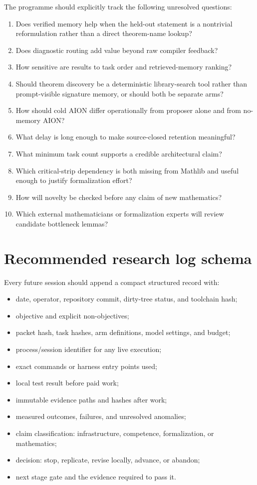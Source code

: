 \documentclass[11pt,a4paper]{article}
\begin{document}
The programme should explicitly track the following unresolved questions:

\begin{enumerate}
  \item Does verified memory help when the held-out statement is a nontrivial
  reformulation rather than a direct theorem-name lookup?
  \item Does diagnostic routing add value beyond raw compiler feedback?
  \item How sensitive are results to task order and retrieved-memory ranking?
  \item Should theorem discovery be a deterministic library-search tool rather
  than prompt-visible signature memory, or should both be separate arms?
  \item How should cold AION differ operationally from proposer alone and from
  no-memory AION?
  \item What delay is long enough to make source-closed retention meaningful?
  \item What minimum task count supports a credible architectural claim?
  \item Which critical-strip dependency is both missing from Mathlib and useful
  enough to justify formalization effort?
  \item How will novelty be checked before any claim of new mathematics?
  \item Which external mathematicians or formalization experts will review
  candidate bottleneck lemmas?
\end{enumerate}

\section{Recommended research log schema}

Every future session should append a compact structured record with:

\begin{itemize}
  \item date, operator, repository commit, dirty-tree status, and toolchain hash;
  \item objective and explicit non-objectives;
  \item packet hash, task hashes, arm definitions, model settings, and budget;
  \item process/session identifier for any live execution;
  \item exact commands or harness entry points used;
  \item local test result before paid work;
  \item immutable evidence paths and hashes after work;
  \item measured outcomes, failures, and unresolved anomalies;
  \item claim classification: infrastructure, competence, formalization, or mathematics;
  \item decision: stop, replicate, revise locally, advance, or abandon;
  \item next stage gate and the evidence required to pass it.
\end{itemize}
\end{document}
